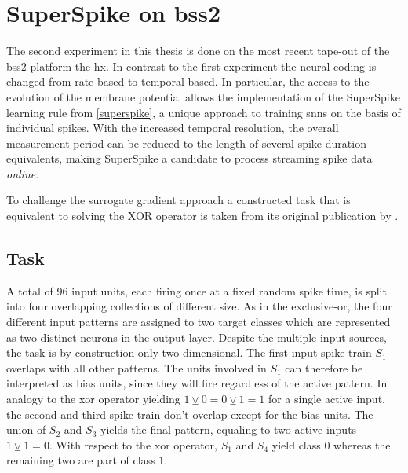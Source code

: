 \chapter{SuperSpike on \acrshort{bss2}}

The second experiment in this thesis is done on the most recent tape-out of the \gls{bss2} platform the \gls{hx}. In contrast to the first experiment the neural coding is changed from rate based to temporal based. In particular, the access to the evolution of the membrane potential allows the implementation of the SuperSpike learning rule from \cref{superspike}, a unique approach to training \glspl{snn} on the basis of individual spikes. With the increased temporal resolution, the overall measurement period can be reduced to the length of several spike duration equivalents, making SuperSpike a candidate to process streaming spike data \emph{online}.

To challenge the surrogate gradient approach a constructed task that is equivalent to solving the XOR operator is taken from its original publication by \cite{zenke2018superspike}.

\section{Task}

A total of 96 input units, each firing once at a fixed random spike time, is split into four overlapping collections of different size. As in the exclusive-or, the four different input patterns are assigned to two target classes which are represented as two distinct neurons in the output layer. Despite the multiple input sources, the task is by construction only two-dimensional. The first input spike train $S_1$ overlaps with all other patterns. The units involved in $S_1$ can therefore be interpreted as bias units, since they will fire regardless of the active pattern. In analogy to the xor operator yielding $1 \veebar 0 = 0 \veebar 1 = 1$ for a single active input, the second and third spike train don't overlap except for the bias units. The union of $S_2$ and $S_3$ yields the final pattern, equaling to two active inputs $1 \veebar 1 = 0$. With respect to the xor operator, $S_1$ and $S_4$ yield class $0$ whereas the remaining two are part of class $1$. 


